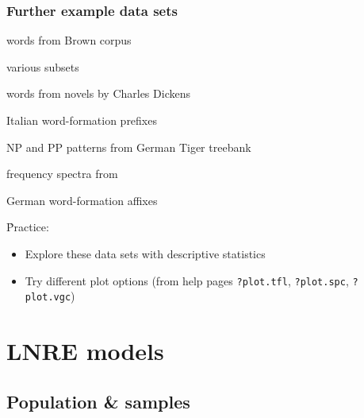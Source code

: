 \documentclass[t]{beamer} %
\begin{document}
\begin{frame}[fragile]
  \frametitle{Further example data sets}

  \begin{description}[labelwidth=5cm]
  \item[\texttt{?Brown}] words from Brown corpus
  \item[\texttt{?BrownSubsets}] various subsets
  \item[\texttt{?Dickens}] words from novels by Charles Dickens
  \item[\texttt{?ItaPref}] Italian word-formation prefixes
  \item[\texttt{?TigerNP}] NP and PP patterns from German Tiger treebank
  \item[\texttt{?Baayen2001}] frequency spectra from \citet{Baayen:01}
  \item[\texttt{?EvertLuedeling2001}] German word-formation affixes \citep[manually corrected data from][]{Evert:Luedeling:01}
  \end{description}

  \h{Practice:}
  \begin{itemize}
  \item Explore these data sets with descriptive statistics
  \item Try different plot options (from help pages \texttt{?plot.tfl}, \texttt{?plot.spc}, \texttt{?plot.vgc})
  \end{itemize}
\end{frame}

\section{LNRE models}

\subsection{Population \& samples}
\end{document}
